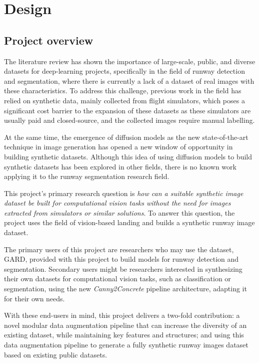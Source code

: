 \chapter{Design}

\section{Project overview}

The literature review has shown the importance of large-scale, public, and diverse datasets for deep-learning projects, specifically in the field of runway detection and segmentation, where there is currently a lack of a dataset of real images with these characteristics. To address this challenge, previous work in the field has relied on synthetic data, mainly collected from flight simulators, which poses a significant cost barrier to the expansion of these datasets as these simulators are usually paid and closed-source, and the collected images require manual labelling.

At the same time, the emergence of diffusion models as the new state-of-the-art technique in image generation has opened a new window of opportunity in building synthetic datasets. Although this idea of using diffusion models to build synthetic datasets has been explored in other fields, there is no known work applying it to the runway segmentation research field.

This project's primary research question is \emph{how can a suitable synthetic
image dataset be built for computational vision tasks without the need for images
extracted from simulators or similar solutions}. To answer this question, the project uses the field of vision-based landing and builds a synthetic runway image dataset.

The primary users of this project are researchers who may use the dataset,
\ac{GARD}, provided with this project to
build models for runway detection and segmentation. Secondary users might be
researchers interested in synthesizing their own datasets for
computational vision tasks, such as classification or segmentation, using the
new
\emph{Canny2Concrete} pipeline architecture, adapting it for their own needs.

With these end-users in mind, this project delivers a two-fold contribution: a novel modular data augmentation pipeline that can increase the diversity of an existing dataset, while maintaining key features and structures; and using this data augmentation pipeline to generate a fully synthetic runway images dataset based on existing public datasets.

